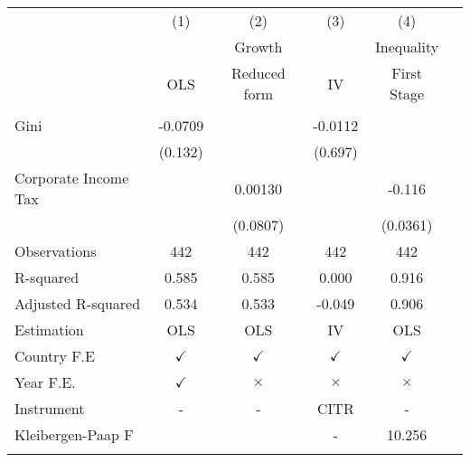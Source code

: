 \begin{tabular}{lccccc} \\ \hline
                    &\multicolumn{1}{c}{(1)}         &\multicolumn{1}{c}{(2)}         &\multicolumn{1}{c}{(3)}         &\multicolumn{1}{c}{(4)}         \\
 & \multicolumn{3}{c}{Growth} &\multicolumn{1}{c}{Inequality} \\ \cline{2-4} & OLS &  \multicolumn{1}{c}{Reduced form} & \multicolumn{1}{c}{IV}& \multicolumn{1}{c}{First Stage} \\ \hline & & & & & &  \\
Gini                &     -0.0709         &                     &     -0.0112         &                     \\
                    &     (0.132)         &                     &     (0.697)         &                     \\
\addlinespace
Corporate Income Tax&                     &     0.00130         &                     &      -0.116\sym{***}\\
                    &                     &    (0.0807)         &                     &    (0.0361)         \\
\arrayrulecolor{black!10}\midrule
Observations        &         442         &         442         &         442         &         442         \\
R-squared           &       0.585         &       0.585         &       0.000         &       0.916         \\
Adjusted R-squared  &       0.534         &       0.533         &      -0.049         &       0.906         \\
Estimation          &         OLS         &         OLS         &          IV         &         OLS         \\
Country F.E         &$\checkmark$         &$\checkmark$         &$\checkmark$         &$\checkmark$         \\
Year F.E.           &$\checkmark$         &    $\times$         &    $\times$         &    $\times$         \\
Instrument          &           -         &           -         &        CITR         &           -         \\
Kleibergen-Paap F   &                     &                     &           -         &      10.256         \\
\arrayrulecolor{black}\bottomrule
\end{tabular}
